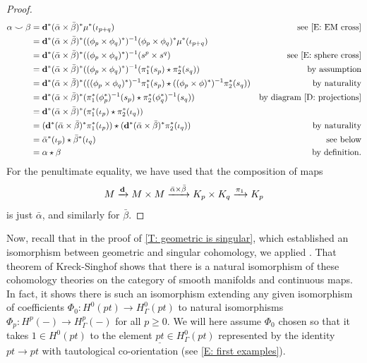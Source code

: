 \begin{proof}

	\begin{align*}
		\alpha\smile \beta& = \mathbf{d}^*(\bar \alpha \times \bar \beta)^*\mu^*(\iota_{p+q})&\text{see \eqref{E: EM cross}}\\
		& = \mathbf{d}^*(\bar \alpha \times \bar \beta)^*((\phi_p \times \phi_q)^*)^{-1}(\phi_p \times \phi_q)^*\mu^*(\iota_{p+q})\\
		& = \mathbf{d}^*(\bar \alpha \times \bar \beta)^*((\phi_p \times \phi_q)^*)^{-1}(s^p \times s^q)&\text{see \eqref{E: sphere cross}}\\
		& = \mathbf{d}^*(\bar \alpha \times \bar \beta)^*((\phi_p \times \phi_q)^*)^{-1}(\pi_1^*(s_p) \star \pi_2^*(s_q))&\text{by assumption}\\
		& = \mathbf{d}^*(\bar \alpha \times \bar \beta)^*(((\phi_p \times \phi_q)^*)^{-1}\pi_1^*(s_p) \star ((\phi_p \times \phi)^*)^{-1}\pi_2^*(s_q))&\text{by naturality}\\
		& = \mathbf{d}^*(\bar \alpha \times \bar \beta)^*(\pi_1^*(\phi_p^*)^{-1}(s_p) \star \pi_2^*(\phi_q^*)^{-1}(s_q))&\text{by diagram \eqref{D: projections}}\\
		& = \mathbf{d}^*(\bar \alpha \times \bar \beta)^*(\pi_1^*(\iota_p) \star \pi_2^*(\iota_q))\\
		& = (\mathbf{d}^*(\bar \alpha \times \bar \beta)^*\pi_1^*(\iota_p)) \star (\mathbf{d}^*(\bar \alpha \times \bar \beta)^*\pi_2^*(\iota_q))&\text{by naturality}\\
		& = \bar\alpha^*(\iota_p) \star \bar\beta^*(\iota_q)&\text{see below}\\
		& = \alpha\star\beta &\text{by definition}.
	\end{align*}
	For the penultimate equality, we have used that the composition of maps $$M \xrightarrow{\mathbf{d}}M \times M \xrightarrow{\bar\alpha \times \bar \beta}K_p \times K_q \xrightarrow{\pi_1}K_p$$ is just $\bar \alpha$, and similarly for $\bar \beta$.
\end{proof}


	Now, recall that in the proof of \cref{T: geometric is singular}, which established an isomorphism between geometric and singular cohomology, we applied \cite[Theorem 10]{Krec10b}.
	That theorem of Kreck-Singhof shows that there is a natural isomorphism of these cohomology theories on the category of smooth manifolds and continuous maps.
	In fact, it shows there is such an isomorphism extending any given isomorphism of coefficients $\Phi_0 \colon H^0(pt) \to H^0_\Gamma(pt)$ to natural isomorphisms $\Phi_p \colon H^p(-) \to H^p_\Gamma(-)$ for all $p\geq 0$.
	We will here assume $\Phi_0$ chosen so that it takes $1 \in H^0(pt)$ to the element $\underline{pt} \in H^0_\Gamma(pt)$ represented by the identity $pt \to pt$ with tautological co-orientation (see \cref{E: first examples}).

